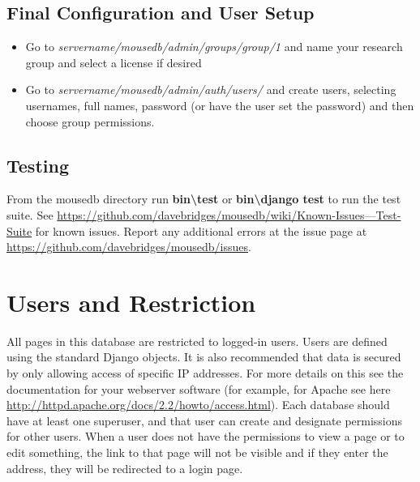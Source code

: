 \documentclass[letterpaper,10pt,english]{sphinxmanual}
\begin{document}
\section{Final Configuration and User Setup}
\label{installation:final-configuration-and-user-setup}\begin{itemize}
\item {} 
Go to \emph{servername/mousedb/admin/groups/group/1} and name your research group and select a license if desired

\item {} 
Go to \emph{servername/mousedb/admin/auth/users/} and create users, selecting usernames, full names, password (or have the user set the password) and then choose group permissions.

\end{itemize}


\section{Testing}
\label{installation:testing}
From the mousedb directory run \textbf{bin\textbackslash{}test} or \textbf{bin\textbackslash{}django test} to run the test suite.  See \href{https://github.com/davebridges/mousedb/wiki/Known-Issues---Test-Suite}{https://github.com/davebridges/mousedb/wiki/Known-Issues---Test-Suite} for known issues.  Report any additional errors at the issue page at \href{https://github.com/davebridges/mousedb/issues}{https://github.com/davebridges/mousedb/issues}.


\chapter{Users and Restriction}
\label{usage:users-and-restriction}\label{usage::doc}
All pages in this database are restricted to logged-in users.  Users are defined using the standard Django \href{http://docs.djangoproject.com/en/dev/topics/auth/\#django.contrib.auth.models.User}{} objects.  It is also recommended that data is secured by only allowing access of specific IP addresses.  For more details on this see the documentation for your webserver software (for example, for Apache see here \href{http://httpd.apache.org/docs/2.2/howto/access.html}{http://httpd.apache.org/docs/2.2/howto/access.html}).  Each database should have at least one superuser, and that user can create and designate permissions for other users.  When a user does not have the permissions to view a page or to edit something, the link to that page will not be visible and if they enter the address, they will be redirected to a login page.
\end{document}
